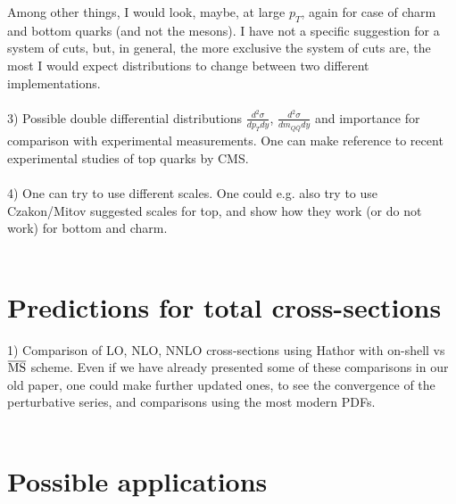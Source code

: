 \documentclass[12pt,a4paper]{article}
\begin{document}
Among other things, I would look, maybe, at large $p_T$, again for case of charm and bottom quarks (and not the mesons). 
I have not a specific suggestion for a system of cuts, but, in general, the more exclusive the system of cuts are, the most I would expect distributions to change between two different implementations. 
\\
\\
3) Possible double differential distributions $\frac{d^2\sigma}{dp_T dy}$, $\frac{d^2\sigma}{dm_{Q\bar{Q}} dy}$ and importance for comparison with experimental measurements. One can make reference to recent experimental studies of top quarks by CMS. 
\\
\\
4) One can try to use different scales. One could e.g. also try to use Czakon/Mitov suggested scales for top, and show how they work (or do not work) for bottom and charm. 
\\
\\

\section{Predictions for total cross-sections}
\label{total}

1) Comparison of LO, NLO, NNLO cross-sections using Hathor with on-shell vs $\overline{\rm MS}$ scheme. Even if we have already presented some of these comparisons in our old paper, one could make further updated ones, to see the convergence of the perturbative series, and comparisons using the most modern PDFs. 
\\
\\

\section{Possible applications}
\label{appli}

\end{document}

